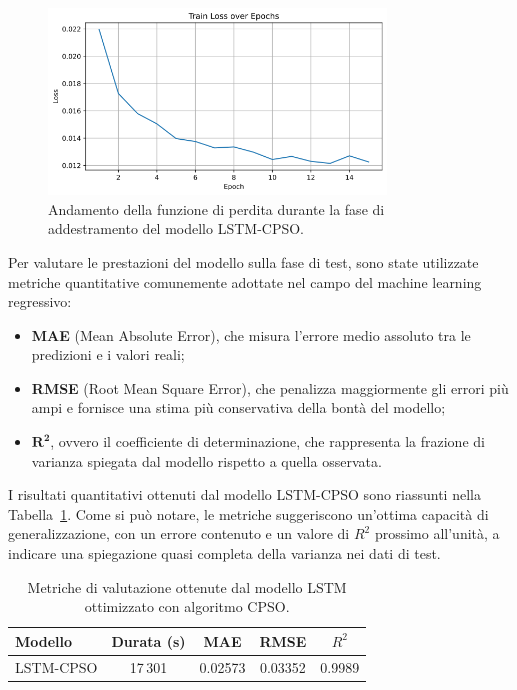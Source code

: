\documentclass{article}
\begin{document}
\begin{figure}[H]
    \centering
    \includegraphics[width=0.8\textwidth]{img/Train Loss.png}
    \caption{Andamento della funzione di perdita durante la fase di addestramento del modello LSTM-CPSO.}
    \label{fig:train_loss}
\end{figure}

Per valutare le prestazioni del modello sulla fase di test, sono state utilizzate metriche quantitative 
comunemente adottate nel campo del machine learning regressivo:

\vspace{0.5em}
\begin{itemize}
    \item \textbf{MAE} (Mean Absolute Error), che misura l’errore medio assoluto tra le predizioni e i valori reali;
    \item \textbf{RMSE} (Root Mean Square Error), che penalizza maggiormente gli errori più ampi e fornisce una stima più conservativa della bontà del modello;
    \item \boldmath$\mathbf{R^2}$\unboldmath{}, ovvero il coefficiente di determinazione, che rappresenta la frazione di varianza spiegata dal modello rispetto a quella osservata.
\end{itemize}
\vspace{0.5em}

I risultati quantitativi ottenuti dal modello LSTM-CPSO sono riassunti nella Tabella~\ref{tab:Result_LSTM_CPSO}. Come si può notare, le metriche suggeriscono un’ottima capacità di generalizzazione, con un errore contenuto e un valore di $R^2$ prossimo all’unità, a indicare una spiegazione quasi completa della varianza nei dati di test.

\begin{table}[H]
    \centering
    \renewcommand{\arraystretch}{1.2}
    \begin{tabular}{lcccc}
        \toprule
        \textbf{Modello} & \textbf{Durata (s)} & \textbf{MAE} & \textbf{RMSE} & \boldmath$R^2$ \\
        \midrule
        LSTM-CPSO & 17\,301 & 0.02573 & 0.03352 & 0.9989 \\
        \bottomrule
    \end{tabular}
    \caption{Metriche di valutazione ottenute dal modello LSTM ottimizzato con algoritmo CPSO.}
    \label{tab:Result_LSTM_CPSO}
\end{table}
\end{document}
